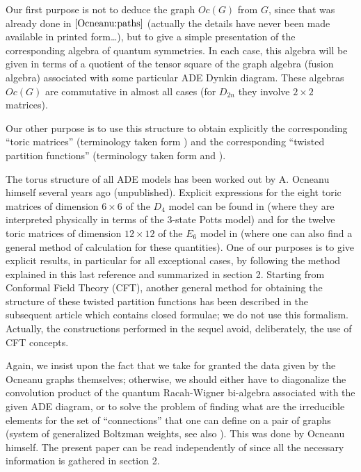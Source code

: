 \documentclass[a4paper,11pt]{article}
\begin{document}
Our first purpose is not to deduce the graph $Oc(G)$ from $G$,
since that was already done in $\cite{Ocneanu:paths}$ (actually the details
have never been made available in printed form\ldots), but to give a
simple  presentation of the corresponding algebra of quantum
symmetries.
In each case, this algebra will be given in terms of a quotient of
the tensor square of the graph algebra (fusion algebra) associated
with some particular ADE Dynkin diagram. These algebras $Oc(G)$ are commutative
in almost all cases (for $D_{2n}$ they involve $2\times 2$ matrices).

Our other purpose is to use this structure to obtain explicitly the
corresponding ``toric matrices'' (terminology taken form
\cite{Coque:qtetra}) and the corresponding ``twisted partition
functions'' (terminology taken form \cite{PetZub:bcft} and
\cite{PetZub:Oc}).

The torus structure of all ADE models has  been worked out by
A. Ocneanu himself several years ago (unpublished).
Explicit expressions for the eight toric matrices of
dimension $6\times 6$ of the $D_{4}$ model can be found in \cite{PetZub:bcft}
(where they are interpreted
physically in terms of the 3-state Potts model) and for the twelve toric matrices
of dimension $12\times 12$ of the  $E_{6}$ model in \cite{Coque:qtetra}
(where one can also find a general method of calculation for these 
quantities). One of our purposes is to give explicit results, in particular for
all exceptional cases, by following the method explained in this last 
reference \cite{Coque:qtetra} and summarized in section 2.
Starting from Conformal Field Theory (CFT), another general method for obtaining the
structure of these twisted partition functions has been described in the
subsequent article \cite{PetZub:Oc} which contains closed formulae;
we do not use this formalism. Actually, 
the constructions performed in the sequel avoid, deliberately, the use of CFT concepts.

Again, we insist upon the fact that we take for granted the data given
by the Ocneanu graphs themselves; otherwise, we should either have to
diagonalize the convolution product of the quantum Racah-Wigner bi-algebra
associated with the given ADE diagram, or to solve the problem of finding
what are the irreducible elements for the set of  ``connections''
that one can define on a pair of graphs (system of generalized
Boltzman weights, see also \cite{Roche:Oc}). This was done by Ocneanu himself.
The present paper can be read independently of \cite{Coque:qtetra} since 
all the necessary information is gathered in section 2.
\end{document}
